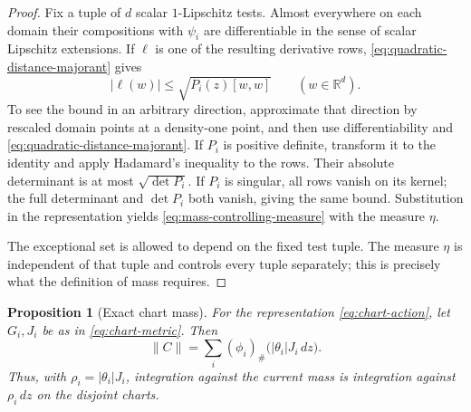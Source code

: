\documentclass[11pt]{article}
\numberwithin{equation}{section}
\newtheorem{proposition}[theorem]{Proposition}
\theoremstyle{definition}
\theoremstyle{remark}
\begin{document}
\begin{proof}
Fix a tuple of \(d\) scalar \(1\)-Lipschitz tests. Almost everywhere on
each domain their compositions with \(\psi_i\) are differentiable in
the sense of scalar Lipschitz extensions. If \(\ell\) is one of the
resulting derivative rows, \eqref{eq:quadratic-distance-majorant} gives
\[
 |\ell(w)|\le\sqrt{P_i(z)[w,w]}\qquad(w\in\mathbb R^d).
\]
To see the bound in an arbitrary direction, approximate that direction
by rescaled domain points at a density-one point, and then use
differentiability and \eqref{eq:quadratic-distance-majorant}.
If \(P_i\) is positive definite, transform it to the identity and apply
Hadamard's inequality to the rows. Their absolute determinant is at most
\(\sqrt{\det P_i}\). If \(P_i\) is singular, all rows vanish on its
kernel; the full determinant and \(\det P_i\) both vanish, giving the
same bound. Substitution in the representation yields
\eqref{eq:mass-controlling-measure} with the measure \(\eta\).

The exceptional set is allowed to depend on the fixed test tuple. The
measure \(\eta\) is independent of that tuple and controls every tuple
separately; this is precisely what the definition of mass requires.
\end{proof}

\begin{proposition}[Exact chart mass]
\label{prop:chart-mass}
For the representation \eqref{eq:chart-action}, let \(G_i,J_i\) be as
in \eqref{eq:chart-metric}. Then
\begin{equation}
\label{eq:chart-mass}
 \|C\|=\sum_i(\phi_i)_\#\bigl(|\theta_i|J_i\,d z\bigr).
\end{equation}
Thus, with \(\rho_i=|\theta_i|J_i\), integration against the current
mass is integration against \(\rho_i\,d z\) on the disjoint charts.
\end{proposition}
\end{document}
